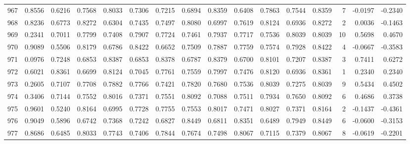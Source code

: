 \begin{tabular}{lrrrrrrrrrrrrrrr}
967 &      0.8556 &  0.6216 &  0.7568 &  0.8033 &  0.7306 &  0.7215 &  0.6894 &  0.8359 &  0.6408 &  0.7863 &   0.7544 &     0.8359 &      7 &                   -0.0197 &                    -0.2340 \\
968 &      0.8236 &  0.6773 &  0.8272 &  0.6304 &  0.7435 &  0.7497 &  0.8080 &  0.6997 &  0.7619 &  0.8124 &   0.6936 &     0.8272 &      2 &                    0.0036 &                    -0.1463 \\
969 &      0.2341 &  0.7011 &  0.7799 &  0.7408 &  0.7907 &  0.7724 &  0.7461 &  0.7937 &  0.7717 &  0.7536 &   0.8039 &     0.8039 &     10 &                    0.5698 &                     0.4670 \\
970 &      0.9089 &  0.5506 &  0.8179 &  0.6786 &  0.8422 &  0.6652 &  0.7509 &  0.7887 &  0.7759 &  0.7574 &   0.7928 &     0.8422 &      4 &                   -0.0667 &                    -0.3583 \\
971 &      0.0976 &  0.7248 &  0.6853 &  0.8387 &  0.6853 &  0.8378 &  0.6787 &  0.8379 &  0.6700 &  0.8101 &   0.7207 &     0.8387 &      3 &                    0.7411 &                     0.6272 \\
972 &      0.6021 &  0.8361 &  0.6699 &  0.8124 &  0.7045 &  0.7761 &  0.7559 &  0.7997 &  0.7476 &  0.8120 &   0.6936 &     0.8361 &      1 &                    0.2340 &                     0.2340 \\
973 &      0.2605 &  0.7107 &  0.7708 &  0.7882 &  0.7766 &  0.7421 &  0.7820 &  0.7680 &  0.7536 &  0.8039 &   0.7275 &     0.8039 &      9 &                    0.5434 &                     0.4502 \\
974 &      0.3406 &  0.7144 &  0.7552 &  0.8016 &  0.7371 &  0.7551 &  0.8092 &  0.7088 &  0.7511 &  0.7934 &   0.7650 &     0.8092 &      6 &                    0.4686 &                     0.3738 \\
975 &      0.9601 &  0.5240 &  0.8164 &  0.6995 &  0.7728 &  0.7755 &  0.7553 &  0.8017 &  0.7471 &  0.8027 &   0.7371 &     0.8164 &      2 &                   -0.1437 &                    -0.4361 \\
976 &      0.9049 &  0.5896 &  0.6742 &  0.7368 &  0.7242 &  0.6827 &  0.8449 &  0.6811 &  0.8351 &  0.6489 &   0.7949 &     0.8449 &      6 &                   -0.0600 &                    -0.3153 \\
977 &      0.8686 &  0.6485 &  0.8033 &  0.7743 &  0.7406 &  0.7844 &  0.7674 &  0.7498 &  0.8067 &  0.7115 &   0.7379 &     0.8067 &      8 &                   -0.0619 &                    -0.2201 \\

\end{tabular}
